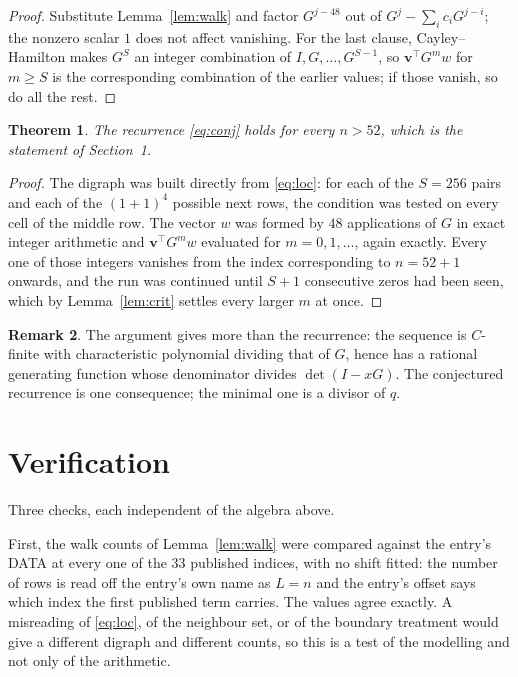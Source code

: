 \documentclass[11pt,a4paper]{article}
\theoremstyle{plain}
\newtheorem{theorem}{Theorem}
\theoremstyle{definition}
\newtheorem{remark}[theorem]{Remark}
\begin{document}
\begin{proof}
Substitute Lemma~\ref{lem:walk} and factor $G^{j-48}$ out of
$G^{j}-\sum_ic_iG^{j-i}$; the nonzero scalar $1$ does not affect
vanishing. For the last clause, Cayley--Hamilton makes $G^{S}$ an integer combination of
$I,G,\dots,G^{S-1}$, so $\mathbf{v}^{\!\top}G^{m}w$ for $m\ge S$ is the corresponding
combination of the earlier values; if those vanish, so do all the rest.
\end{proof}

\begin{theorem}
The recurrence \eqref{eq:conj} holds for every $n>52$, which is the statement of
Section~1.
\end{theorem}

\begin{proof}
The digraph was built directly from \eqref{eq:loc}: for each of the $S=256$ pairs and each
of the $(1+1)^{4}$ possible next rows, the condition was tested on every cell of
the middle row. The vector $w$ was formed by $48$ applications of $G$ in exact integer
arithmetic and $\mathbf{v}^{\!\top}G^{m}w$ evaluated for $m=0,1,\dots$, again exactly.
Every one of those integers vanishes from the index corresponding to $n=52+1$ onwards,
and the run was continued until $S+1$ consecutive zeros had been seen, which by
Lemma~\ref{lem:crit} settles every larger $m$ at once.
\end{proof}

\begin{remark}
The argument gives more than the recurrence: the sequence is $C$-finite with characteristic
polynomial dividing that of $G$, hence has a rational generating function whose denominator
divides $\det(I-xG)$. The conjectured recurrence is one consequence; the minimal one is a
divisor of $q$.
\end{remark}

\section{Verification}

Three checks, each independent of the algebra above.

First, the walk counts of Lemma~\ref{lem:walk} were compared against the entry's DATA at
every one of the $33$ published indices, with no shift fitted: the number of rows is
read off the entry's own name as $L=n$ and the entry's offset says which index the first
published term carries. The values agree exactly. A misreading of \eqref{eq:loc}, of the
neighbour set, or of the boundary treatment would give a different digraph and different
counts, so this is a test of the modelling and not only of the arithmetic.
\end{document}
